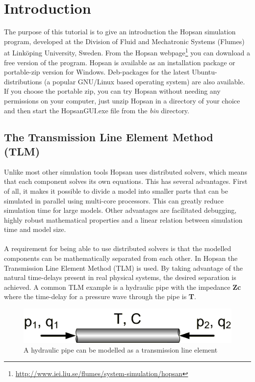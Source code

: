 \documentclass[a4paper,pdftex]{article}
\begin{document}

\section*{Introduction}
The purpose of this tutorial is to give an introduction the Hopsan simulation program, developed at the Division of Fluid and Mechatronic Systems (Flumes) at Linköping University, Sweden.
From the Hopsan webpage\footnote{\url{http://www.iei.liu.se/flumes/system-simulation/hopsan}} you can download a free version of the program.
Hopsan is available as an installation package or portable-zip version for Windows.
Deb-packages for the latest Ubuntu-distributions (a popular GNU/Linux based operating system) are also available.
If you choose the portable zip, you can try Hopsan without needing any permissions on your computer, just unzip Hopsan in a directory of your choice and then start the HopsanGUI.exe file from the \textit{bin} directory.

\subsection*{The Transmission Line Element Method (TLM)}
Unlike most other simulation tools Hopsan uses distributed solvers, which means that each component solves its own equations.
This has several advantages. 
First of all, it makes it possible to divide a model into smaller parts that can be simulated in parallel using multi-core processors. This can greatly reduce simulation time for large models.
Other advantages are facilitated debugging, highly robust mathematical properties and a linear relation between simulation time and model size. 
\\\\
\noindent A requirement for being able to use distributed solvers is that the modelled components can be mathematically separated from each other. 
In Hopsan the Transmission Line Element Method (TLM) is used.
By taking advantage of the natural time-delays present in real physical systems, the desired separation is achieved.
A common TLM example is a hydraulic pipe with the impedance \textbf{Zc} where the time-delay for a pressure wave through the pipe is \textbf{T}.

\begin{figure}[hbt]
  \centering
  \includegraphics[width=0.6\linewidth]{gfx/PosterTransmissionLines.png}
  \caption{A hydraulic pipe can be modelled as a transmission line element}
  \label{fig:hydraulic_pipe}
\end{figure}
\end{document}
